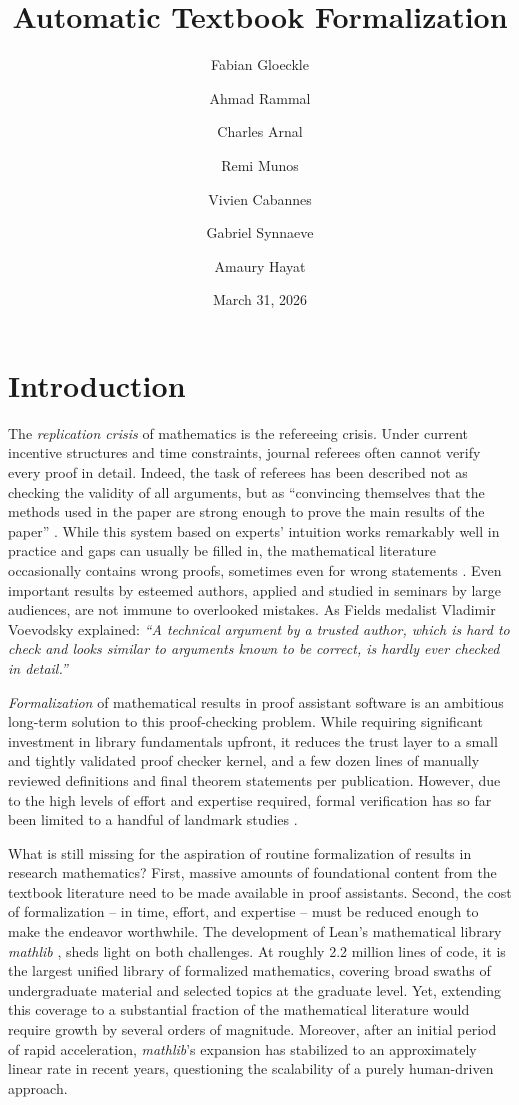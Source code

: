 \documentclass[]{fairmeta}
\title{Automatic Textbook Formalization}
\author[1,2]{Fabian Gloeckle}
\author[1,2]{Ahmad Rammal}
\author[1]{Charles Arnal}
\author[1]{Remi Munos}
\author[1]{Vivien Cabannes}
\author[1]{Gabriel Synnaeve}
\author[2,3]{Amaury Hayat}
\affiliation[1]{\small{FAIR, Meta}}
\affiliation[2]{\small{CERMICS, ENPC, Institut Polytechnique de Paris}}
\affiliation[3]{\small{Korea Institute for Advanced Study}}
\date{March 31, 2026}
\begin{document}
\maketitle
\section{Introduction}



The \emph{replication crisis} of mathematics is the refereeing crisis. 
Under current incentive structures and time constraints, journal referees often cannot verify every proof in detail.
Indeed, the task of referees has been described not as checking the validity of all arguments, but as ``convincing themselves that the methods used in the paper are strong enough to prove the main results of the paper'' \citep{buzzard2020future}. 
While this system based on experts' intuition works remarkably well in practice and gaps can usually be filled in, the mathematical literature occasionally contains wrong proofs, sometimes even for wrong statements \citep[see the examples compiled in][]{voevodsky2014origins,buzzard2020future}.
Even important results by esteemed authors, applied and studied in seminars by large audiences, are not immune to overlooked mistakes. As Fields medalist Vladimir Voevodsky explained:
\emph{``A technical argument by a trusted author, which is hard to check and looks similar to arguments known to be correct, is hardly ever checked in detail.''}


\emph{Formalization} of mathematical results in proof assistant software is an ambitious long-term solution to this proof-checking problem.
While requiring significant investment in library fundamentals upfront, it reduces the trust layer to a small and tightly validated proof checker kernel,
and a few dozen lines of manually reviewed definitions and final theorem statements per publication.
However, due to the high levels of effort and expertise required, formal verification has so far been limited to a handful of landmark studies  \citep[e.g.][]{gonthier2005fourcolour,gonthier2013oddorder,gunther2022independence,vandoorn2023sphereeversion,commelin2023abstractionboundariesspecdriven,becker2025blueprintformalizationcarlesonstheorem}.

What is still missing for the aspiration of routine formalization of results in research mathematics?
First, massive amounts of foundational content from the textbook literature need to be made available in proof assistants.
Second, the cost of formalization -- in time, effort, and expertise -- must be reduced enough to make the endeavor worthwhile.
The development of Lean's mathematical library \emph{mathlib} \citep{The_mathlib_Community_2020}, sheds light on both challenges.
At roughly 2.2 million lines of code, it is the largest unified library of formalized mathematics, covering broad swaths of undergraduate material and selected topics at the graduate level. Yet, extending this coverage to a substantial fraction of the mathematical literature would require growth by several orders of magnitude.
Moreover, after an initial period of rapid acceleration, \emph{mathlib}’s expansion has stabilized to an approximately linear rate in recent years, questioning the scalability of a purely human-driven approach.
\end{document}
